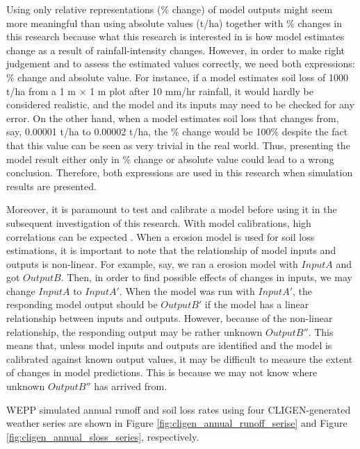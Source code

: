 Using only relative representations (\% change) of model outputs might seem more
meaningful than using absolute values (t/ha) together with \% changes in this
research because what this research is interested in is how model estimates
change as a result of rainfall-intensity changes. However, in order to make
right judgement and to assess the estimated values correctly, we need both
expressions: \% change and absolute value. For instance, if a model estimates
soil loss of 1000 t/ha from a 1 m $\times$ 1 m plot after 10 mm/hr rainfall, it
would hardly be considered realistic, and the model and its inputs may need to
be checked for any error. On the other hand, when a model estimates soil loss
that changes from, say, 0.00001 t/ha to 0.00002 t/ha, the \% change would be
100\% despite the fact that this value can be seen as very trivial in the real
world. Thus, presenting the model result either only in \% change or absolute
value could lead to a wrong conclusion. Therefore, both expressions are used in
this research when simulation results are presented.

Moreover, it is paramount to test and calibrate a model before using it in the
subsequent investigation of this research. With model calibrations, high
correlations can be expected \citep{jetten1999-521,favis-mortlock1998-141}. When
a erosion model is used for soil loss estimations, it is important to note that
the relationship of model inputs and outputs is non-linear. For example, say, we
ran a erosion model with $Input A$ and got $Output B$. Then, in order to find
possible effects of changes in inputs, we may change $Input A$ to $Input A'$.
When the model was run with $Input A'$, the responding model output should be
$Output B'$ if the model has a linear relationship between inputs and outputs.
However, because of the non-linear relationship, the responding output may be
rather unknown $Output B''$. This means that, unless model inputs and
outputs are identified and the model is calibrated against known output values,
it may be difficult to measure the extent of changes in model predictions. This
is because we may not know where unknown $Output B''$ has arrived from.

WEPP simulated annual runoff and soil loss rates using four CLIGEN-generated
weather series are shown in Figure \ref{fig:cligen_annual_runoff_serise} and
Figure \ref{fig:cligen_annual_sloss_series}, respectively.

